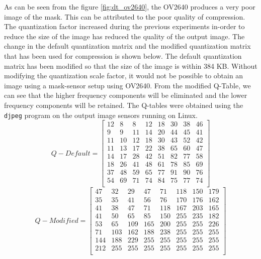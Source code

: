 As can be seen from the figure \ref{fig:dt_ov2640}, the OV2640 produces a very poor image of the mask. This can be attributed to the poor quality of compression. The quantization factor increased during the previous experiments in-order to reduce the size of the image has reduced the quality of the output image. The change in the default quantization matrix and the modified quantization matrix that has been used for compression is shown below. The default quantization matrix has been modified so that the size of the image is within 384 KB. Without modifying the quantization scale factor, it would not be possible to obtain an image using a mask-sensor setup using OV2640. From the modified Q-Table, we can see that the higher frequency components will be eliminated and the lower frequency components will be retained. The Q-tables were obtained using the \texttt{djpeg} program\cite{djpeg} on the output image sensors running on Linux. 
\[
Q-Default = 
\begin{bmatrix}
          12  &  8 &   8  & 12 &  18 &  30 &  38&   46 \\
           9   & 9  & 11  & 14  & 20  & 44   &45  & 41 \\
          11  & 10 &  12  & 18 &  30 &  43 &  52 &  42 \\
          11  & 13  & 17   &22  & 38  & 65  & 60  & 47 \\
          14  & 17  & 28  & 42  & 51 &  82 &  77 &  58 \\
          18  & 26  & 41  & 48 &  61  & 78 &  85  & 69 \\
          37  & 48 &  59 &  65 &  77 &  91 &  90 &  76 \\
          54  & 69  & 71  & 74  & 84  & 75  & 77  & 74 \\
\end{bmatrix}
\]
\[
Q-Modified = 
\begin{bmatrix}
        47 &  32 &  29 &  47 &  71 & 118 & 150 & 179 \\
          35 &  35 &  41 &  56 &  76 & 170 & 176 & 162\\
          41 &  38 &  47  & 71 & 118 & 167 & 203 & 165\\
          41 &  50 &  65  & 85 & 150 & 255 & 235 & 182\\
          53 &  65 & 109 & 165 & 200 & 255 & 255 & 226\\
          71 & 103 & 162 & 188 & 238 & 255 & 255 & 255\\
         144 & 188 & 229 & 255 & 255 & 255 & 255 & 255\\
         212 & 255 & 255 & 255 & 255 & 255 & 255 & 255\\
\end{bmatrix}
\]

